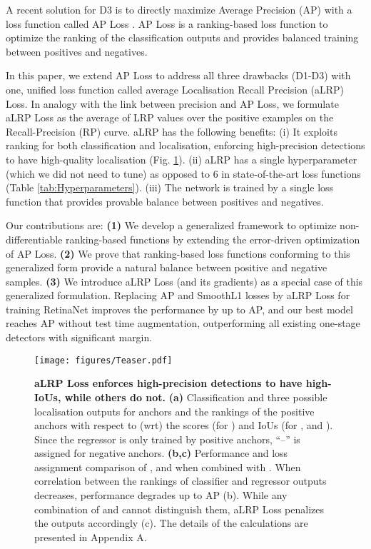 \documentclass{article}
\begin{document}
A recent solution for D3 is to directly maximize Average Precision (AP) with a loss function called AP Loss \cite{APLoss}. AP Loss is a ranking-based loss function to optimize the ranking of the classification outputs and provides balanced training between positives and negatives.

In this paper, we extend AP Loss to address all three drawbacks (D1-D3) with one, unified loss function called average Localisation Recall Precision (aLRP) Loss. In analogy with the link between precision and AP Loss, we formulate aLRP Loss as the average of LRP values \cite{LRP} over the positive examples on the Recall-Precision (RP) curve. aLRP has the following benefits: (i) It exploits ranking for both classification and localisation, enforcing high-precision detections to have high-quality localisation (Fig. \ref{fig:Teaser}). (ii) aLRP has a single hyperparameter (which we did not need to tune) as opposed to 6 in state-of-the-art loss functions (Table \ref{tab:Hyperparameters}). (iii) The network is trained by a single loss function that provides provable balance between positives and negatives.

Our contributions are: 
\textbf{(1)} We develop a generalized framework to  optimize non-differentiable ranking-based functions by extending the error-driven optimization of AP Loss.
\textbf{(2)} We prove that ranking-based loss functions conforming to this generalized form provide a natural balance between positive and negative samples.
\textbf{(3)} We introduce aLRP Loss (and its gradients) as a special case of this generalized formulation. Replacing AP and SmoothL1 losses by aLRP Loss for training RetinaNet improves the performance by up to AP, and our best model reaches AP without test time augmentation, outperforming all existing one-stage detectors with significant margin.





\begin{figure}[t]
    \centerline{
        \texttt{[image: figures/Teaser.pdf]}
    }
    \caption{\textbf{aLRP Loss enforces high-precision detections to have high-IoUs, while others do not.} \textbf{(a)} Classification and three possible localisation outputs for  anchors and the rankings of the positive anchors with respect to (wrt) the scores (for ) and IoUs (for ,  and ). Since the regressor is only trained by positive anchors, ``--'' is assigned for negative anchors. \textbf{(b,c)} Performance and loss assignment comparison of ,  and  when combined with . When correlation between the rankings of classifier and regressor outputs decreases, performance degrades up to  AP (b). While any combination of  and  cannot distinguish  them, aLRP Loss penalizes the outputs accordingly (c). The details of the calculations are presented in Appendix A. 
} 
\label{fig:Teaser}
\end{figure}
\end{document}
